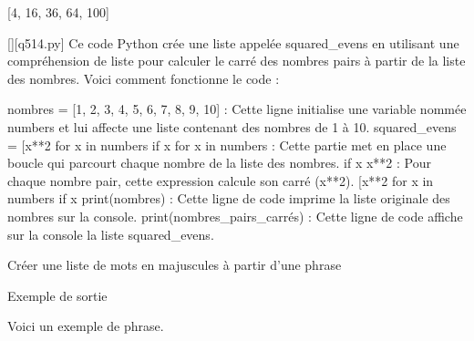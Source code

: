 [4, 16, 36, 64, 100]
        \par
        \begin{solution}
            \renewcommand{\nomfichier}{q514.py}
            \pythonfile{\chemincode \nomfichier}[][\nomfichier]
            Ce code Python crée une liste appelée squared_evens en utilisant une compréhension de liste pour calculer le carré des nombres pairs à partir de la liste des nombres. Voici comment fonctionne le code :

    nombres = [1, 2, 3, 4, 5, 6, 7, 8, 9, 10] : Cette ligne initialise une variable nommée numbers et lui affecte une liste contenant des nombres de 1 à 10.
    squared_evens = [x**2 for x in numbers if x %
        for x in numbers : Cette partie met en place une boucle qui parcourt chaque nombre de la liste des nombres.
        if x %
        x**2 : Pour chaque nombre pair, cette expression calcule son carré (x**2).
        [x**2 for x in numbers if x %
    print(nombres) : Cette ligne de code imprime la liste originale des nombres sur la console.
    print(nombres_pairs_carrés) : Cette ligne de code affiche sur la console la liste squared_evens.
        \end{solution}
        

        \question
        Créer une liste de mots en majuscules à partir d'une phrase

Exemple de sortie

Voici un exemple de phrase.


